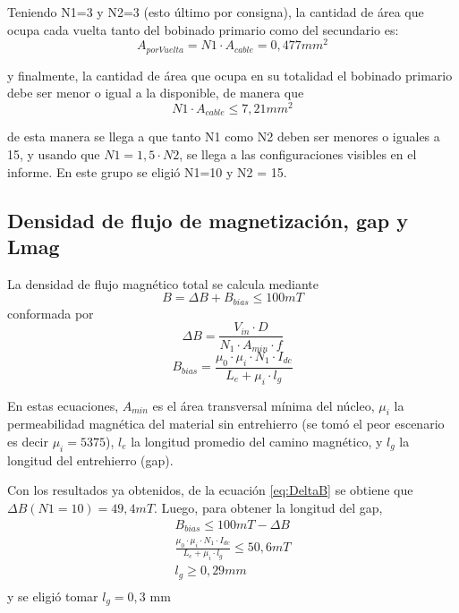 \documentclass{article}
\begin{document}
Teniendo N1=3 y N2=3 (esto último por consigna), la cantidad de área que ocupa cada vuelta tanto del bobinado primario como del secundario es:
\begin{equation*}
    A_{porVuelta} = N1 \cdot A_{cable} = 0,477 mm^2
\end{equation*}

y finalmente, la cantidad de área que ocupa en su totalidad el bobinado primario debe ser menor o igual a la disponible, de manera que
\begin{equation*}
    N1 \cdot A_{cable} \leq 7,21 mm^2
\end{equation*}

de esta manera se llega a que tanto N1 como N2 deben ser menores o iguales a 15, y usando que $ N1 = 1,5 \cdot N2 $, se llega a las configuraciones visibles en el informe. En este grupo se eligió N1=10 y N2 = 15.

\subsection{Densidad de flujo de magnetización, gap y Lmag}

La densidad de flujo magnético total se calcula mediante
\begin{equation*} 
    B = \Delta B + B_{bias} \leq 100 mT
\end{equation*}
conformada por
\begin{equation}
    \Delta B = \frac{V_{in} \cdot D}{N_1 \cdot A_{min} \cdot f}
    \label{eq:DeltaB}
\end{equation}
\begin{equation}
    B_{bias} = \frac{\mu_0 \cdot \mu_i \cdot N_1 \cdot I_{dc}}{L_e + \mu_i \cdot l_g}
    \label{eq:Bbias}
\end{equation}

En estas ecuaciones, $ A_{min} $ es el área transversal mínima del núcleo, $\mu_i$ la permeabilidad magnética del material sin entrehierro (se tomó el peor escenario es decir $\mu_i = 5375$), $l_e$ la longitud promedio del camino magnético, y $l_g$ la longitud del entrehierro (gap).

Con los resultados ya obtenidos, de la ecuación \ref{eq:DeltaB} se obtiene que $ \Delta B (N1=10) = 49,4 mT  $.
Luego, para obtener la longitud del gap,\\
\begin{align*}
     B_{bias} \leq 100mT - \Delta B \\
     \frac{\mu_0 \cdot \mu_i \cdot N_1 \cdot I_{dc}}{L_e + \mu_i \cdot l_g} \leq 50,6 mT  \\
     l_g \geq 0,29 mm  \\
\end{align*}
y se eligió tomar $ l_g = 0,3 $ mm 
\end{document}
